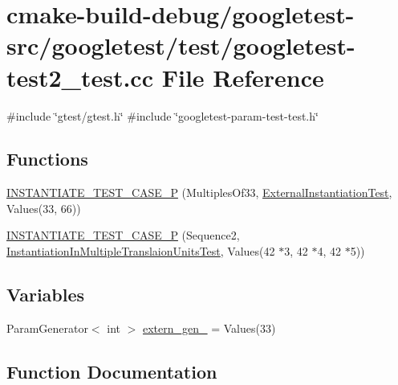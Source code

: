 \hypertarget{googletest-test2__test_8cc}{}\section{cmake-\/build-\/debug/googletest-\/src/googletest/test/googletest-\/test2\+\_\+test.cc File Reference}
\label{googletest-test2__test_8cc}
{\ttfamily \#include \char`\"{}gtest/gtest.\+h\char`\"{}}\newline
{\ttfamily \#include \char`\"{}googletest-\/param-\/test-\/test.\+h\char`\"{}}\newline
\subsection*{Functions}
\begin{DoxyCompactItemize}
\item 
\mbox{\hyperlink{googletest-test2__test_8cc_a433ad86af147648bc394f0f37016f336}{I\+N\+S\+T\+A\+N\+T\+I\+A\+T\+E\+\_\+\+T\+E\+S\+T\+\_\+\+C\+A\+S\+E\+\_\+P}} (Multiples\+Of33, \mbox{\hyperlink{classExternalInstantiationTest}{External\+Instantiation\+Test}}, Values(33, 66))
\item 
\mbox{\hyperlink{googletest-test2__test_8cc_a06b097d2f2746a785ab07df0cc2e80a2}{I\+N\+S\+T\+A\+N\+T\+I\+A\+T\+E\+\_\+\+T\+E\+S\+T\+\_\+\+C\+A\+S\+E\+\_\+P}} (Sequence2, \mbox{\hyperlink{classInstantiationInMultipleTranslaionUnitsTest}{Instantiation\+In\+Multiple\+Translaion\+Units\+Test}}, Values(42 $\ast$3, 42 $\ast$4, 42 $\ast$5))
\end{DoxyCompactItemize}
\subsection*{Variables}
\begin{DoxyCompactItemize}
\item 
Param\+Generator$<$ int $>$ \mbox{\hyperlink{googletest-test2__test_8cc_a4c9bff52d70a57c0563599a919c33bc9}{extern\+\_\+gen\+\_}} = Values(33)
\end{DoxyCompactItemize}


\subsection{Function Documentation}
\mbox{\label{googletest-test2__test_8cc_a433ad86af147648bc394f0f37016f336}} 
